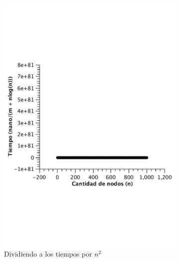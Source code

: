\begin{figure}[H]
        \centering
        \begin{subfigure}[b]{0.45\textwidth}
                \includegraphics[width=\textwidth]{imagenes/vacio-listas-3.pdf}
                \caption{Dividiendo a los tiempos por $n^2$}
        \end{subfigure}
        \begin{subfigure}[b]{0.45\textwidth}

\end{subfigure}
\end{figure}
